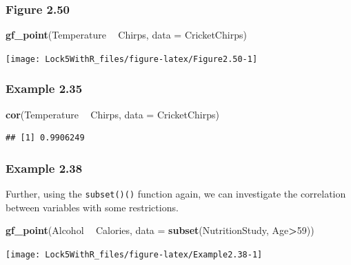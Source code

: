 \documentclass[]{book}
\newenvironment{Shaded}{\begin{snugshade}}{\end{snugshade}}
\newcommand{\DataTypeTok}[1]{\textcolor[rgb]{0.13,0.29,0.53}{#1}}
\newcommand{\DecValTok}[1]{\textcolor[rgb]{0.00,0.00,0.81}{#1}}
\newcommand{\KeywordTok}[1]{\textcolor[rgb]{0.13,0.29,0.53}{\textbf{#1}}}
\newcommand{\NormalTok}[1]{#1}
\newcommand{\OperatorTok}[1]{\textcolor[rgb]{0.81,0.36,0.00}{\textbf{#1}}}
\newcommand{\StringTok}[1]{\textcolor[rgb]{0.31,0.60,0.02}{#1}}
\begin{document}
\hypertarget{figure-2.50}{%
\subsubsection{Figure 2.50}\label{figure-2.50}}

\begin{Shaded}
\begin{Highlighting}[]
\KeywordTok{gf_point}\NormalTok{(Temperature }\OperatorTok{~}\StringTok{ }\NormalTok{Chirps, }\DataTypeTok{data =}\NormalTok{ CricketChirps)}
\end{Highlighting}
\end{Shaded}

\texttt{[image: Lock5WithR\_files/figure-latex/Figure2.50-1]}

\hypertarget{example-2.35}{%
\subsubsection{Example 2.35}\label{example-2.35}}

\begin{Shaded}
\begin{Highlighting}[]
\KeywordTok{cor}\NormalTok{(Temperature }\OperatorTok{~}\StringTok{ }\NormalTok{Chirps, }\DataTypeTok{data =}\NormalTok{ CricketChirps)}
\end{Highlighting}
\end{Shaded}

\begin{verbatim}
## [1] 0.9906249
\end{verbatim}

\hypertarget{example-2.38}{%
\subsubsection{Example 2.38}\label{example-2.38}}

Further, using the \texttt{subset()()} function again, we can investigate the correlation between variables with some restrictions.

\begin{Shaded}
\begin{Highlighting}[]
\KeywordTok{gf_point}\NormalTok{(Alcohol }\OperatorTok{~}\StringTok{ }\NormalTok{Calories, }\DataTypeTok{data =} \KeywordTok{subset}\NormalTok{(NutritionStudy, Age}\OperatorTok{>}\DecValTok{59}\NormalTok{))}
\end{Highlighting}
\end{Shaded}

\texttt{[image: Lock5WithR\_files/figure-latex/Example2.38-1]}
\end{document}

